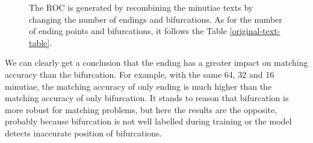 \begin{figure}[h!]
    
    \caption{The ROC is generated by recombining the minutiae texts by changing the number of endings and bifurcations. As for the number of ending points and bifurcations, it follows the Table \ref{original-text-table}.}
    \label{original-text}
\end{figure}


We can clearly get a conclusion that the ending has a greater impact on matching accuracy than the bifurcation. For example, with the same 64, 32 and 16 minutiae, the matching accuracy of only ending is much higher than the matching accuracy of only bifurcation. It stands to reason that bifurcation is more robust for matching problems, but here the results are the opposite, probably because bifurcation is not well labelled during training or the model detects inaccurate position of bifurcations.




